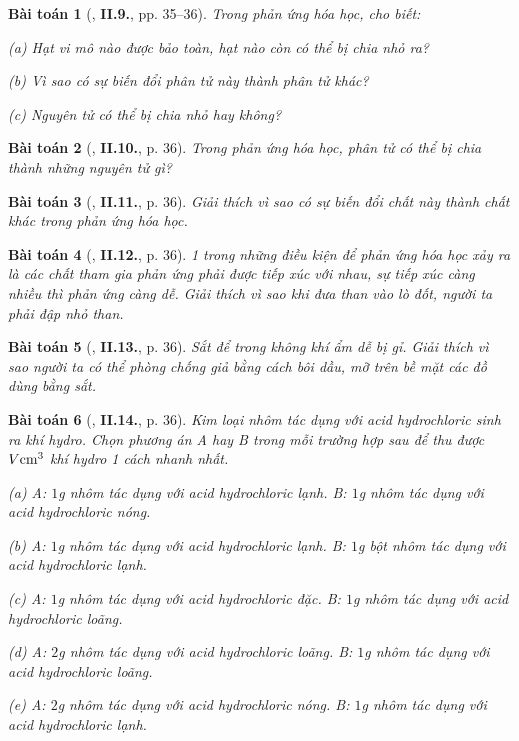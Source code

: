\documentclass{article}
\numberwithin{equation}{section}
\newtheorem{baitoan}{Bài toán}
\begin{document}
\begin{baitoan}[\cite{Truong2021}, \textbf{II.9.}, pp. 35--36]
	Trong phản ứng hóa học, cho biết:
	\begin{enumerate*}
		\item[(a)] Hạt vi mô nào được bảo toàn, hạt nào còn có thể bị chia nhỏ ra?
		\item[(b)] Vì sao có sự biến đổi phân tử này thành phân tử khác?
		\item[(c)] Nguyên tử có thể bị chia nhỏ hay không?
	\end{enumerate*}
\end{baitoan}

\begin{baitoan}[\cite{Truong2021}, \textbf{II.10.}, p. 36]
	Trong phản ứng hóa học, phân tử \emph{} có thể bị chia thành những nguyên tử gì?
\end{baitoan}

\begin{baitoan}[\cite{Truong2021}, \textbf{II.11.}, p. 36]
	Giải thích vì sao có sự biến đổi chất này thành chất khác trong phản ứng hóa học.
\end{baitoan}

\begin{baitoan}[\cite{Truong2021}, \textbf{II.12.}, p. 36]
	1 trong những điều kiện để phản ứng hóa học xảy ra là các chất tham gia phản ứng phải được tiếp xúc với nhau, sự tiếp xúc càng nhiều thì phản ứng càng dễ. Giải thích vì sao khi đưa than vào lò đốt, người ta phải đập nhỏ than.
\end{baitoan}

\begin{baitoan}[\cite{Truong2021}, \textbf{II.13.}, p. 36]
	Sắt để trong không khí ẩm dễ bị gỉ. Giải thích vì sao người ta có thể phòng chống giả bằng cách bôi dầu, mỡ trên bề mặt các đồ dùng bằng sắt.
\end{baitoan}

\begin{baitoan}[\cite{Truong2021}, \textbf{II.14.}, p. 36]
	Kim loại nhôm tác dụng với acid hydrochloric sinh ra khí hydro. Chọn phương án A hay B trong mỗi trường hợp sau để thu được $V{\rm cm}^3$ khí hydro 1 cách nhanh nhất.
	\begin{enumerate*}
		\item[(a)] A: $1$\emph{g} nhôm tác dụng với acid hydrochloric lạnh. B: $1$\emph{g} nhôm tác dụng với acid hydrochloric nóng.
		\item[(b)] A: $1$\emph{g} nhôm tác dụng với acid hydrochloric lạnh. B: $1$\emph{g} bột nhôm tác dụng với acid hydrochloric lạnh.
		\item[(c)] A: $1$\emph{g} nhôm tác dụng với acid hydrochloric đặc. B: $1$\emph{g} nhôm tác dụng với acid hydrochloric loãng.
		\item[(d)] A: $2$\emph{g} nhôm tác dụng với acid hydrochloric loãng. B: $1$\emph{g} nhôm tác dụng với acid hydrochloric loãng.
		\item[(e)] A: $2$\emph{g} nhôm tác dụng với acid hydrochloric nóng. B: $1$\emph{g} nhôm tác dụng với acid hydrochloric lạnh.
	\end{enumerate*}
\end{baitoan}
\end{document}
